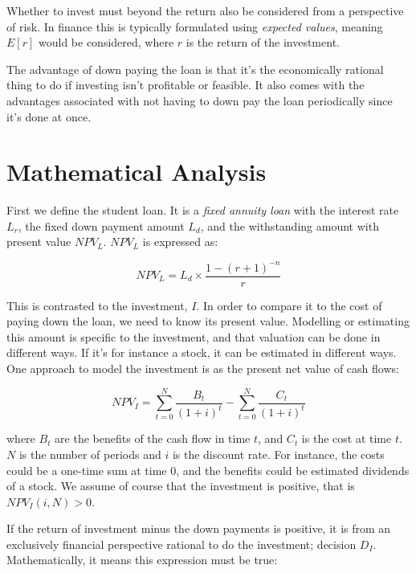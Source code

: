 \documentclass[a4paper]{article}
\begin{document}
Whether to invest must beyond the return also be considered from a perspective
of risk. In finance this is typically formulated using \emph{expected values},
meaning $E[r]$ would be considered, where $r$ is the return of the investment.

The advantage of down paying the loan is that it's the economically rational
thing to do if investing isn't profitable or feasible. It also comes with the
advantages associated with not having to down pay the loan periodically since
it's done at once.

\section{Mathematical Analysis}

First we define the student loan. It is a \emph{fixed annuity loan} with the
interest rate $L_r$, the fixed down payment amount $L_d$, and the withstanding
amount with present value $NPV_L$. $NPV_L$ is expressed as:


\begin{equation}
\label{eq:NPV_L}
NPV_L=L_d \times \frac{1 - (r + 1)^{-n}}{r}
\end{equation}

This is contrasted to the investment, $I$. In order to compare it to the cost
of paying down the loan, we need to know its present value. Modelling or
estimating this amount is specific to the investment, and that valuation can be
done in different ways. If it's for instance a stock, it can be estimated in
different ways. One approach to model the investment is as the present net
value of cash flows:


\begin{equation}
\label{eq:NPV_I}
NPV_I = {\sum_{t=0}^{N} \frac{B_t}{(1 + i)^t} -
         \sum_{t=0}^{N} \frac{C_t}{(1 + i)^t}}
\end{equation}

where $B_t$ are the benefits of the cash flow in time $t$, and $C_t$ is the cost
at time $t$. $N$ is the number of periods and $i$ is the discount rate. For
instance, the costs could be a one-time sum at time $0$, and the benefits could
be estimated dividends of a stock. We assume of course that the investment is
positive, that is $NPV_I(i, N) > 0$.

If the return of investment minus the down payments is positive, it is from an
exclusively financial perspective rational to do the investment; decision $D_I$.
Mathematically, it means this expression must be true:
\end{document}
